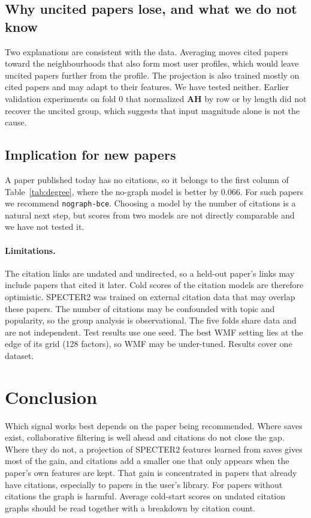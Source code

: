 \documentclass[10pt]{article}
\begin{document}
\subsection{Why uncited papers lose, and what we do not know}
Two explanations are consistent with the data. Averaging moves cited papers toward the neighbourhoods that also form most user profiles, which would leave uncited papers further from the profile. The projection is also trained mostly on cited papers and may adapt to their features. We have tested neither. Earlier validation experiments on fold 0 that normalized $\mathbf{A}\mathbf{H}$ by row or by length did not recover the uncited group, which suggests that input magnitude alone is not the cause.

\subsection{Implication for new papers}
A paper published today has no citations, so it belongs to the first column of Table~\ref{tab:degree}, where the no-graph model is better by 0.066. For such papers we recommend \texttt{nograph-bce}. Choosing a model by the number of citations is a natural next step, but scores from two models are not directly comparable and we have not tested it.

\paragraph{Limitations.} The citation links are undated and undirected, so a held-out paper's links may include papers that cited it later. Cold scores of the citation models are therefore optimistic. SPECTER2 was trained on external citation data that may overlap these papers. The number of citations may be confounded with topic and popularity, so the group analysis is observational. The five folds share data and are not independent. Test results use one seed. The best WMF setting lies at the edge of its grid (128 factors), so WMF may be under-tuned. Results cover one dataset.

\section{Conclusion}
Which signal works best depends on the paper being recommended. Where saves exist, collaborative filtering is well ahead and citations do not close the gap. Where they do not, a projection of SPECTER2 features learned from saves gives most of the gain, and citations add a smaller one that only appears when the paper's own features are kept. That gain is concentrated in papers that already have citations, especially to papers in the user's library. For papers without citations the graph is harmful. Average cold-start scores on undated citation graphs should be read together with a breakdown by citation count.
\end{document}
